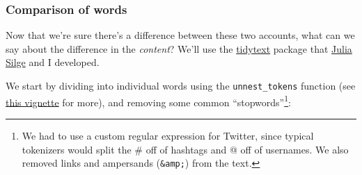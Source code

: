 \documentclass[
]{article}
\newenvironment{Shaded}{\begin{snugshade}}{\end{snugshade}}
\newcommand{\CharTok}[1]{\textcolor[rgb]{0.31,0.60,0.02}{#1}}
\newcommand{\DataTypeTok}[1]{\textcolor[rgb]{0.13,0.29,0.53}{#1}}
\newcommand{\KeywordTok}[1]{\textcolor[rgb]{0.13,0.29,0.53}{\textbf{#1}}}
\newcommand{\NormalTok}[1]{#1}
\newcommand{\OperatorTok}[1]{\textcolor[rgb]{0.81,0.36,0.00}{\textbf{#1}}}
\newcommand{\StringTok}[1]{\textcolor[rgb]{0.31,0.60,0.02}{#1}}
\begin{document}
\hypertarget{comparison-of-words}{%
\subsubsection{Comparison of words}\label{comparison-of-words}}

Now that we're sure there's a difference between these two accounts,
what can we say about the difference in the \emph{content}? We'll use
the \href{https://cran.r-project.org/web/packages/tidytext}{tidytext}
package that \href{http://juliasilge.com/}{Julia Silge} and I developed.

We start by dividing into individual words using the
\texttt{unnest\_tokens} function (see
\href{https://cran.r-project.org/web/packages/tidytext/vignettes/tidytext.html}{this
vignette} for more), and removing some common ``stopwords''\footnote{We
  had to use a custom regular expression for Twitter, since typical
  tokenizers would split the \# off of hashtags and @ off of usernames.
  We also removed links and ampersands (\texttt{\&amp;}) from the text.}:

\begin{Shaded}
\end{Shaded}
\end{document}
